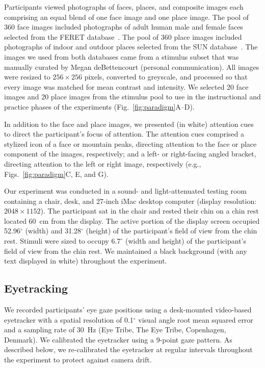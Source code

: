 \documentclass[english]{article}
\begin{document}
Participants viewed photographs of faces, places, and composite images each
comprising an equal blend of one face image and one place image. The pool of
360 face images included photographs of adult human male and female faces
selected from the FERET database~\citep{PhilEtal98}. The pool of 360 place
images included photographs of indoor and outdoor places selected from the SUN
database~\citep{XiaoEtal10}. The images we used from both databases came from a
stimulus subset that was manually curated by Megan deBettencourt (personal
communication). All images were resized to $256 \times 256$ pixels, converted
to greyscale, and processed so that every image was matched for mean contrast
and intensity. We selected 20 face images and 20 place images from the stimulus
pool to use in the instructional and practice phases of the experiments
(Fig.~\ref{fig:paradigm}A--D).

In addition to the face and place images, we presented (in white) attention
cues to direct the participant's focus of attention. The attention cues
comprised a stylized icon of a face or mountain peaks, directing attention to
the face or place component of the images, respectively; and a left- or
right-facing angled bracket, directing attention to the left or right image,
respectively (e.g., Figs.~\ref{fig:paradigm}C, E, and G).

 Our experiment was conducted in a sound- and light-attenuated testing room
 containing a chair, desk, and 27-inch iMac desktop computer (display
 resolution: $2048 \times 1152$). The participant sat in the chair and rested
 their chin on a chin rest located 60~cm from the display. The active portion
 of the display screen occupied 52.96$^\circ$ (width) and 31.28$^\circ$
 (height) of the participant's field of view from the chin rest. Stimuli were
 sized to occupy $6.7^\circ$ (width and height) of the participant's field of
 view from the chin rest. We maintained a black background (with any text
 displayed in white) throughout the experiment.

\subsection*{Eyetracking}

We recorded participants' eye gaze positions using a desk-mounted video-based
eyetracker with a spatial resolution of 0.1$^\circ$ visual angle root mean
squared error and a sampling rate of 30~Hz (Eye Tribe, The Eye Tribe,
Copenhagen, Denmark). We calibrated the eyetracker using a 9-point gaze
pattern. As described below, we re-calibrated the eyetracker at regular
intervals throughout the experiment to protect against camera drift.
\end{document}
